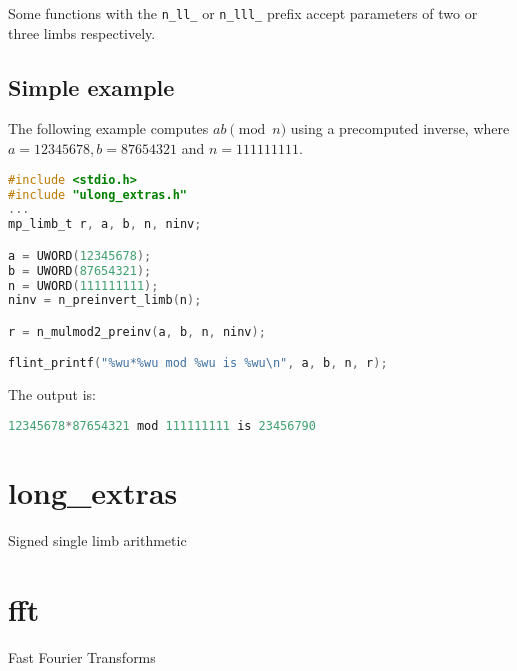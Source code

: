\documentclass[a4paper,10pt]{book}
\newcommand{\code}{\lstinline}
\begin{document}
{{Some functions with the \code{n_ll_} or \code{n_lll_} prefix accept
parameters of two or three limbs respectively.

\section{Simple example}

The following example computes $ab \pmod{n}$ using a precomputed
inverse, where $a = 12345678, b = 87654321$ and $n = 111111111$.

\begin{lstlisting}[language=c]
#include <stdio.h>
#include "ulong_extras.h"
...
mp_limb_t r, a, b, n, ninv;

a = UWORD(12345678);
b = UWORD(87654321);
n = UWORD(111111111);
ninv = n_preinvert_limb(n);

r = n_mulmod2_preinv(a, b, n, ninv);

flint_printf("%wu*%wu mod %wu is %wu\n", a, b, n, r);
\end{lstlisting}

The output is:
\begin{lstlisting}[language=c]
12345678*87654321 mod 111111111 is 23456790
\end{lstlisting}




\chapter{long\_extras}
\epigraph{Signed single limb arithmetic}{}




\chapter{fft}
\epigraph{Fast Fourier Transforms}{}



}}
\end{document}
